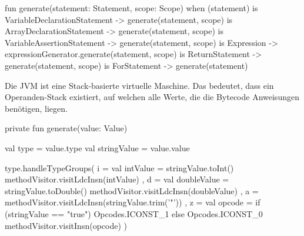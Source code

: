 \begin{KotlinCode}[numbers=none, caption={Die \texttt{generate()} Funktion von \texttt{StatementGenerator}, welche \textit{sealed classes} nutzt.}]
fun generate(statement: Statement, scope: Scope) {
    when (statement) {
        is VariableDeclarationStatement -> generate(statement, scope)
        is ArrayDeclarationStatement -> generate(statement, scope)
        is VariableAssertionStatement -> generate(statement, scope)
        is Expression -> expressionGenerator.generate(statement, scope)
        is ReturnStatement -> generate(statement, scope)
        is ForStatement -> generate(statement)
    }
}
\end{KotlinCode}

Die JVM ist eine Stack-basierte virtuelle Maschine. Das bedeutet, dass ein Operanden-Stack existiert, auf welchen alle Werte, die die Bytecode Anweisungen benötigen, liegen.

\begin{KotlinCode}[numbers=none, caption={\texttt{generate()} Funktion, welche Wert-Literale erzeugt.}]
private fun generate(value: Value) {
    val type = value.type
    val stringValue = value.value

    type.handleTypeGroups(
        i = {
            val intValue = stringValue.toInt()
            methodVisitor.visitLdcInsn(intValue)
        },
        d = {
            val doubleValue = stringValue.toDouble()
            methodVisitor.visitLdcInsn(doubleValue)
        },
        a = { methodVisitor.visitLdcInsn(stringValue.trim('"')) },
        z = {
            val opcode = if (stringValue == "true") Opcodes.ICONST_1 else Opcodes.ICONST_0
            methodVisitor.visitInsn(opcode)
        }
    )
}
\end{KotlinCode}